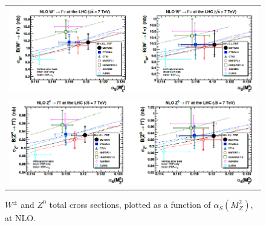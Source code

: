 \begin{figure}[H]
\centering
\begin{tabular}{c}
\includegraphics[scale=0.5]{chapter3/pdf-alpha.png}\\
\includegraphics[scale=0.5]{chapter3/pdf-alpha1.png}
\end{tabular}
\caption{$W^{\pm}$ and $Z^{0}$ total cross sections, plotted as a function of $\alpha_{S}(M_{Z}^{2})$, at NLO.~\cite{Watt_2011}}
\label{crossection7tev}
\end{figure}








 

